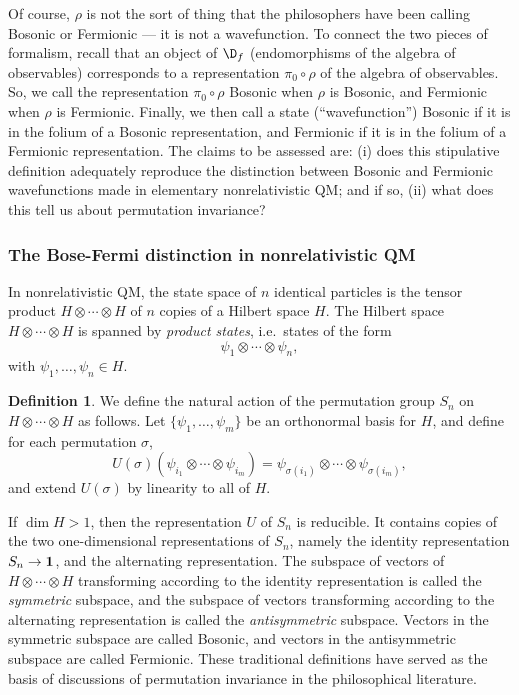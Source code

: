 \documentclass[11pt]{article}
\theoremstyle{definition}
\theoremstyle{definition}
\newtheorem{defn}[thm]{Definition}
\theoremstyle{remark}
\def\1#1{{\bf #1}}
\begin{document}
Of course, $\rho$ is not the sort of thing that the philosophers have
been calling Bosonic or Fermionic --- it is not a wavefunction.  To
connect the two pieces of formalism, recall that an object of $\D _f$
(endomorphisms of the algebra of observables) corresponds to a
representation $\pi _0\circ \rho$ of the algebra of observables.  So,
we call the representation $\pi _0\circ \rho$ Bosonic when $\rho$ is
Bosonic, and Fermionic when $\rho$ is Fermionic.  Finally, we then
call a state (``wavefunction'') Bosonic if it is in the folium of a
Bosonic representation, and Fermionic if it is in the folium of a
Fermionic representation.  The claims to be assessed are: (i) does
this stipulative definition adequately reproduce the distinction
between Bosonic and Fermionic wavefunctions made in elementary
nonrelativistic QM; and if so, (ii) what does this tell us about
permutation invariance?

\subsubsection{The Bose-Fermi distinction in nonrelativistic QM}

In nonrelativistic QM, the state space of $n$ identical particles is
the tensor product $H\otimes \cdots \otimes H$ of $n$ copies of a
Hilbert space $H$.  The Hilbert space $H\otimes \cdots \otimes H$ is
spanned by \emph{product states}, i.e.\ states of the form
$$ \psi _1\otimes \cdots \otimes \psi _n ,$$
with $\psi _1,\dots ,\psi _n\in H$.  

\begin{defn} We define the natural action of the permutation group
  $S_n$ on $H\otimes \cdots \otimes H$ as follows.  Let $\{ \psi
  _1,\dots ,\psi _m\}$ be an orthonormal basis for $H$, and define for
  each permutation $\sigma$,
$$ U(\sigma )(\psi _{i_1}\otimes \cdots \otimes \psi _{i_m}) = \psi
_{\sigma (i_1)}\otimes \cdots \otimes \psi _{\sigma (i_m)} ,$$
and extend $U(\sigma )$ by linearity to all of $H$.  
\end{defn}
If $\dim H>1$, then the representation $U$ of $S_n$ is reducible.  It
contains copies of the two one-dimensional representations of $S_n$,
namely the identity representation $S_n\to \11$, and the alternating
representation.  The subspace of vectors of $H\otimes \cdots \otimes
H$ transforming according to the identity representation is called the
\emph{symmetric} subspace, and the subspace of vectors transforming
according to the alternating representation is called the
\emph{antisymmetric} subspace.  Vectors in the symmetric subspace are
called Bosonic, and vectors in the antisymmetric subspace are called
Fermionic.  These traditional definitions have served as the basis of
discussions of permutation invariance in the philosophical literature.
\end{document}
